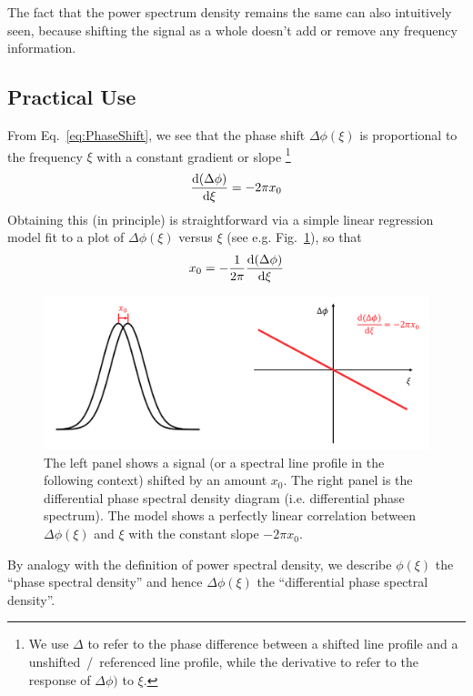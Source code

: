 The fact that the power spectrum density remains the same can also intuitively seen, because shifting the signal as a whole 
doesn't add or remove any frequency information. 


\subsection{Practical Use}

From Eq.~\ref{eq:PhaseShift}, we see that the phase shift $\Delta \phi(\xi)$ is proportional to the frequency $\xi$
with a constant gradient or slope 
\footnote{We use $\Delta$ to refer to the phase difference between a shifted line profile and a unshifted~/~referenced line profile, while the derivative to refer to the response of $\Delta \phi)$ to $\xi$.}
\begin{equation}
	\dv{(\Delta \phi)}{\xi} = -2 \pi x_0
\label{eq:gradient}
\end{equation}
Obtaining this (in principle) is straightforward via a simple linear regression model fit to a plot of $\Delta \phi(\xi)$ versus $\xi$ 
 (see e.g. Fig.~\ref{fig:FT}), so that
\begin{equation}
	x_0 = -\frac{1}{2 \pi}\dv{(\Delta \phi)}{\xi}
\label{eq:line_shift}
\end{equation}

\begin{figure}[tbp]
\centering
\includegraphics[width = 0.99 \linewidth]
{./Figures/Methods/FT.png}
\caption[Translation property of Fourier transform]
{The left panel shows a signal (or a spectral line profile in the following context) shifted by an amount $x_0$. 
The right panel is the differential phase spectral density diagram (i.e. differential phase spectrum). 
The model shows a perfectly linear correlation 
between $\Delta \phi(\xi)$ and $\xi$ with the constant slope $-2 \pi x_0$.}
\label{fig:FT}
\end{figure} 

By analogy with the definition of power spectral density, we describe $\phi(\xi)$ the ``phase spectral density'' and hence $\Delta \phi(\xi)$ the ``differential phase spectral density''. 

